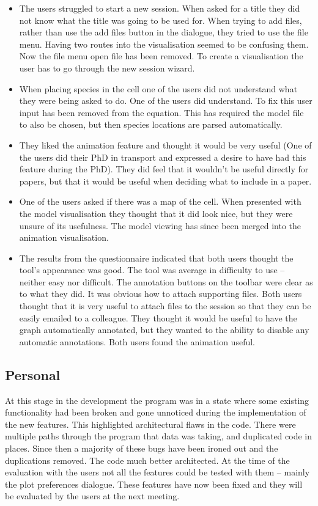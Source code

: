 \begin{itemize}
\item The users struggled to start a new session.  When asked for a title they did not know what the title was going to be used for.  When trying to add files, rather than use the add files button in the dialogue, they tried to use the file menu.  Having two routes into the visualisation seemed to be confusing them.  Now the file menu open file has been removed.  To create a visualisation the user has to go through the new session wizard.
\item When placing species in the cell one of the users did not understand what they were being asked to do.  One of the users did understand.  To fix this user input has been removed from the equation.  This has required the model file to also be chosen, but then species locations are parsed automatically.
\item They liked the animation feature and thought it would be very useful (One of the users did their PhD in transport and expressed a desire to have had this feature during the PhD).  They did feel that it wouldn't be useful directly for papers, but that it would be useful when deciding what to include in a paper.
\item One of the users asked if there was a map of the cell.  When presented with the model visualisation they thought that it did look nice, but they were unsure of its usefulness.  The model viewing has since been merged into the animation visualisation.
\item The results from the questionnaire indicated that both users thought the tool's appearance was good.  The tool was average in difficulty to use -- neither easy nor difficult. The annotation buttons on the toolbar were clear as to what they did. It was obvious how to attach supporting files.  Both users thought that it is very useful to attach files to the session so that they can be easily emailed to a colleague.  They thought it would be useful to have the graph automatically annotated, but they wanted to the ability to disable any automatic annotations.  Both users found the animation useful.
\end{itemize}

\subsection{Personal}


At this stage in the development the program was in a state where some existing functionality had been broken and gone unnoticed during the implementation of the new features.  This highlighted architectural flaws in the code.  There were multiple paths through the program that data was taking, and duplicated code in places.  Since then a majority of these bugs have been ironed out and the duplications removed. The code much better architected.  At the time of the evaluation with the users not all the features could be tested with them -- mainly the plot preferences dialogue.  These features have now been fixed and they will be evaluated by the users at the next meeting.

